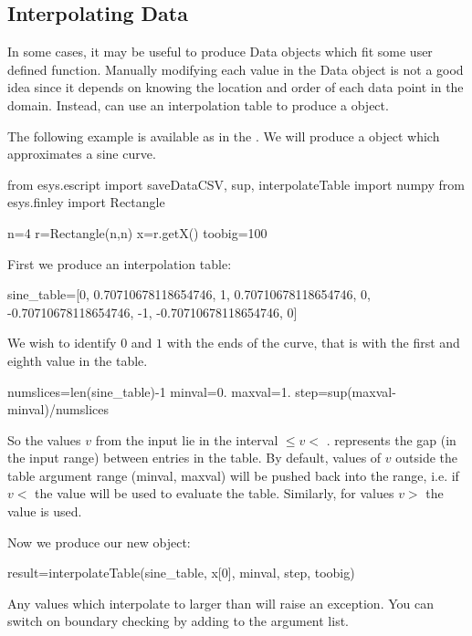 \subsection{Interpolating Data}
In some cases, it may be useful to produce Data objects which fit some user
defined function.
Manually modifying each value in the Data object is not a good idea since it
depends on knowing the location and order of each data point in the domain.
Instead, \escript can use an interpolation table to produce a \Data object.

The following example is available as  in the \ExampleDirectory.
We will produce a \Data object which approximates a sine curve.

\begin{python}
  from esys.escript import saveDataCSV, sup, interpolateTable
  import numpy
  from esys.finley import Rectangle

  n=4
  r=Rectangle(n,n)
  x=r.getX()
  toobig=100	
\end{python}

\noindent First we produce an interpolation table:
\begin{python}
  sine_table=[0, 0.70710678118654746, 1, 0.70710678118654746, 0,
             -0.70710678118654746, -1, -0.70710678118654746, 0]
\end{python}
%
We wish to identify $0$ and $1$ with the ends of the curve, that is
with the first and eighth value in the table.

\begin{python}
  numslices=len(sine_table)-1
  minval=0.
  maxval=1.
  step=sup(maxval-minval)/numslices
\end{python}
%
So the values $v$ from the input lie in the interval
 $\leq v <$ .
 represents the gap (in the input range) between entries in the table.
By default, values of $v$ outside the table argument range (minval, maxval)
will be pushed back into the range, i.e. if $v <$  the value
 will be used to evaluate the table.
Similarly, for values $v>$  the value  is used.

Now we produce our new \Data object:

\begin{python}
  result=interpolateTable(sine_table, x[0], minval, step, toobig)
\end{python}
Any values which interpolate to larger than  will raise an
exception. You can switch on boundary checking by adding
 to the argument list.

